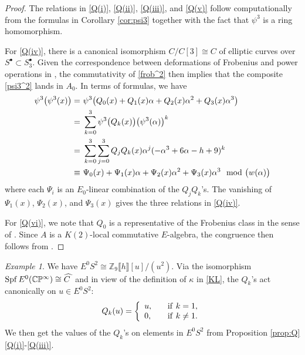 \documentclass{gtpart}
\theoremstyle{definition}
\theoremstyle{remark}
\newtheorem{ex}[thm]{Example}
\newcommand{\mb}[1]{\mathbb{#1}}
\newcommand{\Spf}{{\rm Spf\thinspace}}
\newcommand{\BC}{{\mb C}}
\newcommand{\BP}{{\mb P}}
\newcommand{\BZ}{{\mb Z}}
\newcommand{\HC}{\widehat{C~}\!}
\newcommand{\md}{~~{\rm mod}~}
\newcommand{\A}{\alpha}
\newcommand{\K}{\kappa}
\newcommand{\p}{\psi^3}
\newcommand{\s}{S^\bullet}
\newcommand{\q}[1]{Proposition \ref{prop:Q}\thinspace \eqref{Q(#1)}}
\begin{document}
\begin{proof}
 The relations in \eqref{Q(i)}, \eqref{Q(ii)}, \eqref{Q(iii)}, and 
 \eqref{Q(v)} follow computationally from the formulas in Corollary 
 \ref{cor:psi3} together with the fact that $\p$ is a ring homomorphism.  

 For \eqref{Q(iv)}, there is a canonical isomorphism $C/C[3] \cong C$ of 
 elliptic curves over $\s \subset \s_3$.  Given the correspondence 
 between deformations of Frobenius and power operations in 
 \cite[Theorem B]{cong}, the commutativity of \eqref{frob^2} then 
 implies that the composite \eqref{psi3^2} lands in $A_0$.  In terms of 
 formulas, we have 
 \begin{equation*}
 \begin{split}
  \p \big( \p(x) \big) = & ~ \p \big( Q_0(x) + Q_1(x) \A + Q_2(x) \A^2 + Q_3(x) \A^3 \big) \\
                       = & ~ \sum_{k = 0}^3 \p \big( Q_k(x) \big) \big( \p(\A) \big)^k \\
                       = & ~ \sum_{k = 0}^3 \sum_{j = 0}^3 Q_jQ_k(x) \A^j (-\A^3 + 6 \A - h + 9)^k \\
                  \equiv & ~ \Psi_0(x) + \Psi_1(x) \A + \Psi_2(x) \A^2 + \Psi_3(x) \A^3 \md \big( w(\A) \big) 
 \end{split}
 \end{equation*}
 where each $\Psi_i$ is an $E_0$-linear combination of the $Q_jQ_k$'s.  
 The vanishing of $\Psi_1(x)$, $\Psi_2(x)$, and $\Psi_3(x)$ gives the 
 three relations in \eqref{Q(iv)}.  

 For \eqref{Q(vi)}, we note that $Q_0$ is a representative of the 
 Frobenius class in the sense of \cite[10.3]{cong}.  Since $A$ is a 
 $K(2)$-local commutative $E$-algebra, the congruence then follows from 
 \cite[Theorem A]{cong}.  
\end{proof}

\begin{ex}
\label{ex}
 We have $E^0 S^2 \cong \BZ_9 \llbracket h \rrbracket [u] / (u^2)$.  Via 
 the isomorphism $\Spf E^0(\BC\BP^\infty) \cong \HC$ and in view of the 
 definition of $\K$ in \eqref{KL}, the $Q_k$'s act canonically on 
 $u \in E^0 S^2$: 
 \[
  Q_k(u) = \left\{
  \begin{array}{ll}
    u,  & \quad {\rm if}~k = 1, \\
    0,  & \quad {\rm if}~k \neq 1.  \\
  \end{array}
  \right.
 \]
 We then get the values of the $Q_k$'s on elements in $E^0 S^2$ from 
 \q{i}-\eqref{Q(iii)}.  
\end{ex}
\end{document}
